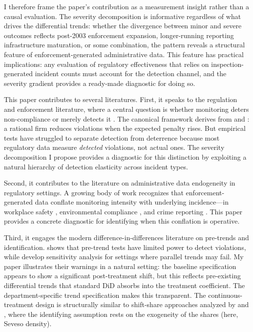 \documentclass[12pt]{article}
\begin{document}
I therefore frame the paper's contribution as a measurement insight rather than a causal evaluation. The severity decomposition is informative regardless of what drives the differential trends: whether the divergence between minor and severe outcomes reflects post-2003 enforcement expansion, longer-running reporting infrastructure maturation, or some combination, the pattern reveals a structural feature of enforcement-generated administrative data. This feature has practical implications: any evaluation of regulatory effectiveness that relies on inspection-generated incident counts must account for the detection channel, and the severity gradient provides a ready-made diagnostic for doing so.

This paper contributes to several literatures. First, it speaks to the regulation and enforcement literature, where a central question is whether monitoring deters non-compliance or merely detects it \citep{gray1993,shimshack2007,duflo2013,duflo2018,johnson2020}. The canonical framework derives from \citet{becker1968} and \citet{stigler1970}: a rational firm reduces violations when the expected penalty rises. But empirical tests have struggled to separate detection from deterrence because most regulatory data measure \textit{detected} violations, not actual ones. The severity decomposition I propose provides a diagnostic for this distinction by exploiting a natural hierarchy of detection elasticity across incident types.

Second, it contributes to the literature on administrative data endogeneity in regulatory settings. A growing body of work recognizes that enforcement-generated data conflate monitoring intensity with underlying incidence---in workplace safety \citep{gray1998,johnson2020}, environmental compliance \citep{shimshack2007,bennear2007}, and crime reporting \citep{levitt1997,chalfin2018}. This paper provides a concrete diagnostic for identifying when this conflation is operative.

Third, it engages the modern difference-in-differences literature on pre-trends and identification. \citet{roth2022} shows that pre-trend tests have limited power to detect violations, while \citet{rambachan2023} develop sensitivity analysis for settings where parallel trends may fail. My paper illustrates their warnings in a natural setting: the baseline specification appears to show a significant post-treatment shift, but this reflects pre-existing differential trends that standard DiD absorbs into the treatment coefficient. The department-specific trend specification makes this transparent. The continuous-treatment design is structurally similar to shift-share approaches analyzed by \citet{goldsmithpinkham2020} and \citet{borusyak2022}, where the identifying assumption rests on the exogeneity of the shares (here, Seveso density).
\end{document}
